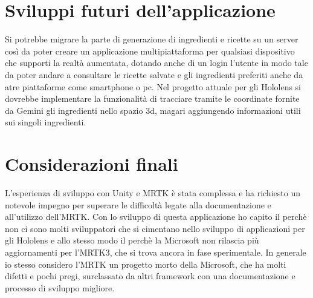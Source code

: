 \section{Sviluppi futuri dell'applicazione}
Si potrebbe migrare la parte di generazione di ingredienti e ricette su un server così da poter creare un applicazione multipiattaforma per qualsiasi dispositivo che supporti la realtà aumentata, dotando anche di un login l'utente in modo tale da poter andare a consultare le ricette salvate e gli ingredienti preferiti anche da atre piattaforme come smartphone o pc. Nel progetto attuale per gli Hololens si dovrebbe implementare la funzionalità di tracciare tramite le coordinate fornite da Gemini gli ingredienti nello spazio 3d, magari aggiungendo informazioni utili sui singoli ingredienti.

\section{Considerazioni finali}
L'esperienza di sviluppo con Unity e MRTK è stata complessa e ha richiesto un notevole impegno per superare le difficoltà legate alla documentazione e all'utilizzo dell'MRTK. Con lo sviluppo di questa applicazione ho capito il perchè non ci sono molti sviluppatori che si cimentano nello sviluppo di applicazioni per gli Hololens e allo stesso modo il perchè la Microsoft non rilascia più aggiornamenti per l'MRTK3, che si trova ancora in fase sperimentale. In generale io stesso considero l'MRTK un progetto morto della Microsoft, che ha molti difetti e pochi pregi, surclassato da altri framework con una documentazione e processo di sviluppo migliore. 